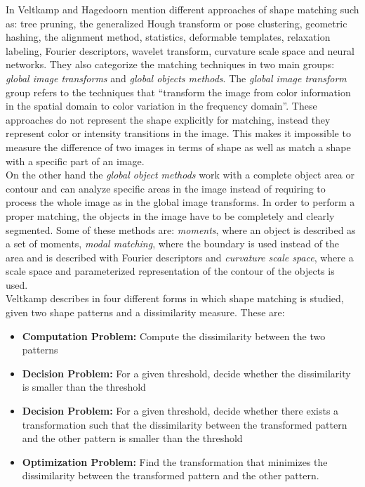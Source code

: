 In \cite{matchingbook} Veltkamp and Hagedoorn mention different 
approaches of shape matching such as: tree pruning, the
generalized Hough transform or pose clustering, geometric hashing,
the alignment method, statistics, deformable templates, relaxation
labeling, Fourier descriptors, wavelet transform, curvature
scale space and neural networks.
They also categorize the matching techniques in two main groups:
\emph{global image transforms} and \emph{global objects methods}.
The \emph{global image transform} group refers to the techniques that
``transform the image from color information in the spatial
domain to color variation in the frequency domain''. 
These approaches do not represent the shape explicitly for 
matching, instead they represent color or intensity transitions 
in the image. This makes it impossible to measure the difference of 
two images in terms of shape as well as match a shape with a 
specific part of an image.\\
On the other hand the \emph{global object methods} work with a complete
object area or contour and can analyze specific areas in the 
image instead of requiring to process the whole image as in 
the global image transforms. In order to perform a proper
matching, the objects in the image have to be completely and
clearly segmented. Some of these methods are: \emph{moments}, where an
object is described as a set of moments, \emph{modal matching},
where the boundary is used instead of the area and is described 
with Fourier descriptors and \emph{curvature scale space}, where a
scale space and parameterized representation of the contour of the 
objects is used.\\

Veltkamp describes in \cite{matching2} four different forms in
which shape matching is studied, given two shape patterns
and a dissimilarity measure. These are:

\begin{itemize}
\item \textbf{Computation Problem: }Compute the dissimilarity
  between the two patterns
\item \textbf{Decision Problem: }For a given threshold, decide
  whether the dissimilarity is smaller than the threshold
\item \textbf{Decision Problem: }For a given threshold, decide
  whether there exists a transformation such that the
dissimilarity between the transformed pattern and the other 
pattern is smaller than the threshold
\item \textbf{Optimization Problem: }Find the transformation
that minimizes the dissimilarity between the transformed
pattern and the other pattern.
\end{itemize}

